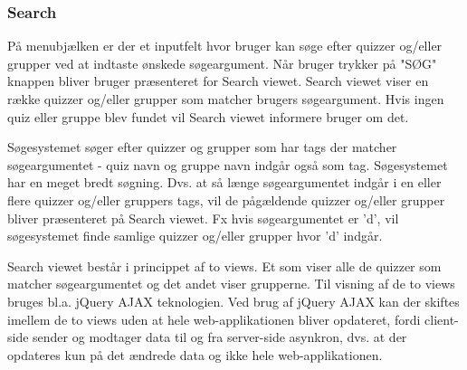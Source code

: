 \subsubsection{Search}

På menubjælken er der et inputfelt hvor bruger kan søge efter quizzer og/eller grupper ved at indtaste ønskede søgeargument. Når bruger trykker på "SØG" knappen bliver bruger præsenteret for Search viewet. Search viewet viser en række quizzer og/eller grupper som matcher brugers søgeargument. Hvis ingen quiz eller gruppe blev fundet vil Search viewet informere bruger om det. 

Søgesystemet søger  efter quizzer og grupper som har tags der matcher søgeargumentet - quiz navn og gruppe navn indgår også som tag. Søgesystemet har en meget bredt søgning. Dvs. at så længe søgeargumentet indgår i en eller flere quizzer og/eller gruppers tags, vil de pågældende quizzer og/eller grupper bliver præsenteret på Search viewet. Fx hvis søgeargumentet er 'd', vil søgesystemet finde samlige quizzer og/eller grupper hvor 'd' indgår.  


Search viewet består i princippet af to views. Et som viser alle de quizzer som matcher søgeargumentet og det andet viser grupperne. Til visning af de to views bruges bl.a. jQuery AJAX teknologien. Ved brug af jQuery AJAX kan der skiftes imellem de to views uden at hele web-applikationen bliver opdateret, fordi client-side sender og modtager data til og fra server-side asynkron, dvs. at der opdateres kun på det ændrede data og ikke hele web-applikationen. 



